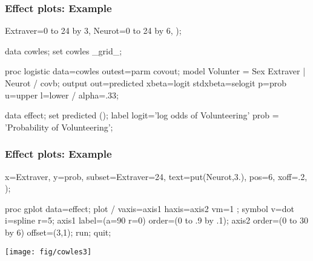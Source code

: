 \begin{frame}[fragile]
  \frametitle{Effect plots: Example}
\begin{Input}[fontsize=\footnotesize,label=\fbox{\texttt{cowles3.sas}},baselinestretch=0.8]
   Extraver=0 to 24 by 3,  
   Neurot=0 to 24 by 6,   
   );               

data cowles;
   set cowles _grid_;

proc logistic data=cowles outest=parm covout;
   model Volunter = Sex Extraver | Neurot  / covb;
   output out=predicted xbeta=logit stdxbeta=selogit 
      p=prob u=upper l=lower / alpha=.33;

data effect;
   set predicted ();
   label logit='log odds of Volunteering'
      prob = 'Probability of Volunteering';
\end{Input}

\end{frame}

\begin{frame}[fragile]
  \frametitle{Effect plots: Example}
\begin{Input}[fontsize=\footnotesize,label=\fbox{$\cdots$ \texttt{cowles3.sas}},baselinestretch=0.75,firstnumber=23]
   x=Extraver, y=prob, 
   subset=Extraver=24,       
   text=put(Neurot,3.),      
   pos=6, xoff=.2, );

proc gplot data=effect;
   plot  / 
      vaxis=axis1 haxis=axis2 vm=1
      ;
   symbol v=dot i=spline r=5;
   axis1 label=(a=90 r=0) order=(0 to .9 by .1);
   axis2 order=(0 to 30 by 6) offset=(3,1);
run; quit;
\end{Input}
 \begin{center}
  \texttt{[image: fig/cowles3]}
 \end{center}

\end{frame}
